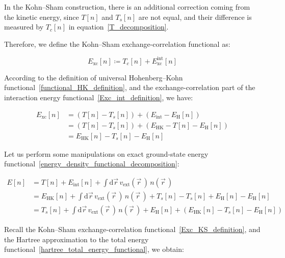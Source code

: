 In the Kohn--Sham construction, there is an additional correction coming from the kinetic energy, since $T[n]$ and $T_s[n]$ are not equal, and their difference is measured by $T_c[n]$ in equation~\eqref{T_decomposition}.

Therefore, we define the Kohn--Sham exchange-correlation functional as:

\begin{equation}
    E_\mathrm{xc}[n]\coloneqq T_c[n]+E_\mathrm{xc}^{\mathrm{int}}[n]
\label{Exc_KS_sum}
\end{equation}

According to the definition of universal Hohenberg--Kohn functional~\eqref{functional_HK_definition}, 
and the exchange-correlation part of the interaction energy functional~\eqref{Exc_int_definition},
we have:

\begin{equation}
\begin{aligned}
    E_\mathrm{xc}[n]
    &= (T[n]-T_s[n]) + (E_\mathrm{int}-E_\mathrm{H}[n]) \\
    &= (T[n]-T_s[n]) + (E_\mathrm{HK}-T[n]-E_\mathrm{H}[n]) \\
    &= E_\mathrm{HK}[n]-T_s[n]-E_\mathrm{H}[n]
\end{aligned}
\label{Exc_KS_definition}
\end{equation}

Let us perform some manipulations on exact ground-state energy functional~\eqref{energy_density_functional_decomposition}:

\begin{equation}
\begin{aligned}
    E[n] &= T[n]+E_\mathrm{int}[n]
    +\int\mathrm{d}\vec{r}\,v_\mathrm{ext}(\vec{r}\,)\,n(\vec{r}\,) \\
    &= E_\mathrm{HK}[n]
    + \int\mathrm{d}\vec{r}\,v_\mathrm{ext}(\vec{r}\,)\,n(\vec{r}\,)
    + T_s[n] - T_s[n] + E_\mathrm{H}[n] - E_\mathrm{H}[n] \\
    &= T_s[n] +
    \int\mathrm{d}\vec{r}\,v_\mathrm{ext}(\vec{r}\,)\,n(\vec{r}\,)
    + E_\mathrm{H}[n] + (E_\mathrm{HK}[n]-T_s[n]-E_\mathrm{H}[n])
\end{aligned}
\label{energy_density_functional_manipulations}
\end{equation}

Recall the Kohn--Sham exchange-correlation functional~\eqref{Exc_KS_definition},
and the Hartree approximation to the total energy functional~\eqref{hartree_total_energy_functional},
we obtain:

